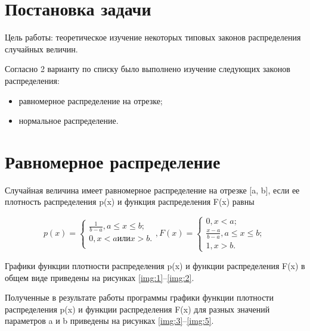 \documentclass[a4paper, 14pt, unknownkeysallowed]{extreport}
\begin{document}

\setcounter{page}{2}

\chapter{Постановка задачи}
Цель работы: теоретическое изучение некоторых типовых законов распределения случайных величин.

Согласно 2 варианту по списку было выполнено изучение следующих законов распределения:
\begin{itemize}
	\item равномерное распределение на отрезке;
	\item нормальное распределение.
\end{itemize}


\chapter{Равномерное распределение}

Случайная величина имеет равномерное распределение на отрезке [a, b], если ее плотность распределения p(x) и функция распределения F(x) равны

\begin{equation}
	p(x) = \begin{cases}
		\frac{1}{b - a}, a\leq x\leq b;\\
		0, x < a или x > b.\\
	\end{cases},   
	F(x) =  \begin{cases}
		0, x < a;\\
		\frac{x-a}{b-a}, a\leq x\leq b;\\
		1, x > b.
	\end{cases}
\end{equation}

Графики функции плотности распределения p(x) и функции распределения F(x) в общем виде приведены на рисунках \ref{img:1}--\ref{img:2}.




Полученные в результате работы программы графики функции плотности распределения p(x) и функции распределения F(x) для разных значений параметров a и b приведены на рисунках \ref{img:3}--\ref{img:5}.
\end{document}
